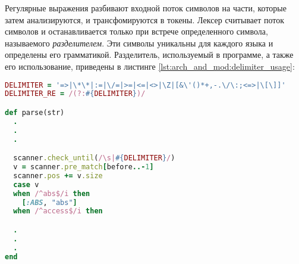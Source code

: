 Регулярные выражения разбивают входной поток символов на части, которые затем анализируются, и трансфомируются в токены. Лексер считывает поток символов и останавливается только при встрече определенного символа, называемого \textit{разделителем}. Эти символы уникальны для каждого языка и определены его грамматикой. Разделитель, используемый в программе, а также его использование, приведены в листинге \ref{lst:arch_and_mod:delimiter_usage}:
\begin{lstlisting}[language=Ruby, style=rubystyle,caption={Определение и использование разделителя}, label=lst:arch_and_mod:delimiter_usage]
DELIMITER = '=>|\*\*|:=|\/=|>=|<=|<>|\Z|[&\'()*+,-.\/\:;<=>|\[\]]'
DELIMITER_RE = /(?:#{DELIMITER})/

def parse(str)
  .
  .
  .

  scanner.check_until(/\s|#{DELIMITER}/)
  v = scanner.pre_match[before..-1]
  scanner.pos += v.size
  case v
  when /^abs$/i then
    [:ABS, "abs"]
  when /^access$/i then

  .
  .
  .
end
\end{lstlisting}

